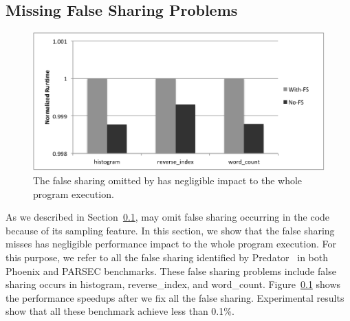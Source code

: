 \subsection{Missing False Sharing Problems}

\begin{figure}[htbp]
\centering
\label{fig:fsinfs}
\includegraphics[width=.8\columnwidth]{figure/trivial}
\caption{The false sharing omitted by \cheetah{} has negligible impact to the whole program execution.}
\end{figure}

As we described in Section~\ref{}, \cheetah{} may omit false sharing occurring in the code because of its sampling feature. In this section, we show that the false sharing \cheetah{} misses has negligible performance impact to the whole program execution.  For this purpose, we refer to all the false sharing identified by Predator~\cite{} in both Phoenix and PARSEC benchmarks. These false sharing problems include false sharing occurs in histogram, reverse\_index, and word\_count. Figure~\ref{} shows the performance speedups after we fix all the false sharing. Experimental results show that all these benchmark achieve less than 0.1\%. 

